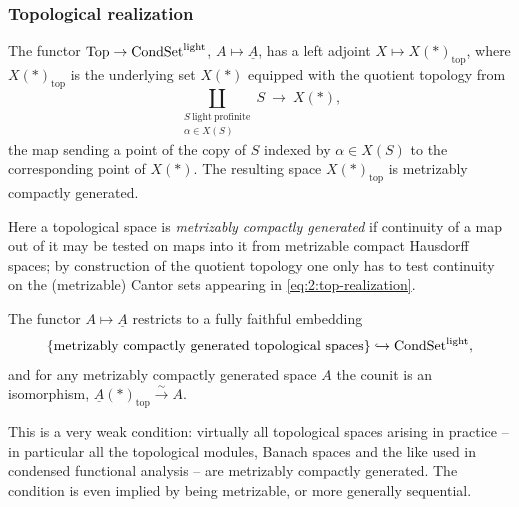\subsubsection*{Topological realization}

\begin{proposition}
\label{prop:2:top-realization}
The functor $\mathrm{Top}\to\mathrm{CondSet}^{\mathrm{light}}$, $A\mapsto\underline{A}$, has a left
adjoint $X\mapsto X(\ast)_{\mathrm{top}}$, where $X(\ast)_{\mathrm{top}}$ is the
underlying set $X(\ast)$ equipped with the quotient topology from
\begin{equation}
\label{eq:2:top-realization}
\coprod_{\substack{S\ \mathrm{light\ profinite}\\ \alpha\in X(S)}} S\
\longrightarrow\ X(\ast),
\end{equation}
the map sending a point of the copy of $S$ indexed by $\alpha\in X(S)$ to the
corresponding point of $X(\ast)$. The resulting space $X(\ast)_{\mathrm{top}}$ is
metrizably compactly generated.
\end{proposition}

Here a topological space is \emph{metrizably compactly generated} if continuity
of a map out of it may be tested on maps into it from metrizable compact
Hausdorff spaces; by construction of the quotient topology one only has to test
continuity on the (metrizable) Cantor sets appearing in
\eqref{eq:2:top-realization}.

\begin{corollary}
\label{cor:2:top-fully-faithful}
The functor $A\mapsto\underline{A}$ restricts to a fully faithful embedding
\[
\{\text{metrizably compactly generated topological spaces}\}\hookrightarrow
\mathrm{CondSet}^{\mathrm{light}},
\]
and for any metrizably compactly generated space $A$ the counit is an
isomorphism, $\underline{A}(\ast)_{\mathrm{top}}\xrightarrow{\ \sim\ }A$.
\end{corollary}

This is a very weak condition: virtually all topological spaces arising in
practice -- in particular all the topological modules, Banach spaces and the
like used in condensed functional analysis -- are metrizably compactly
generated. The condition is even implied by being metrizable, or more generally
sequential.

